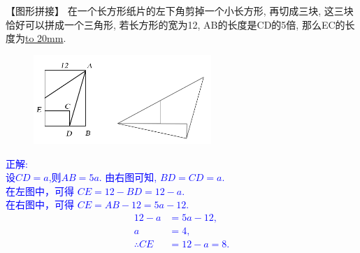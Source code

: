\item {
    【图形拼接】
    在一个长方形纸片的左下角剪掉一个小长方形, 再切成三块,  这三块恰好可以拼成一个三角形, 若长方形的宽为12, AB的长度是CD的5倍, 那么EC的长度为\underline{\hbox to 20mm{}}.
    \begin{figure}[H] 
        \centering
        \includegraphics[width=0.6\textwidth]{./pics/Chapter_2/6.png}
    \end{figure}
    \ifshowSolution 
        \fangsong{}\textcolor{blue}{
            正解: \\
            设$CD=a$,则$AB=5a$.
            由右图可知, $BD=CD=a$. \\
            在左图中，可得 $CE = 12-BD = 12-a$.\\
            在右图中，可得 $CE = AB-12=5a-12$.\\
            \begin{align*}
                12-a &= 5a-12 ,\\
                a &= 4,\\
                \therefore CE &= 12-a=8.
            \end{align*}
        }
    \else
        \vspace{1cm}
    \fi
}


